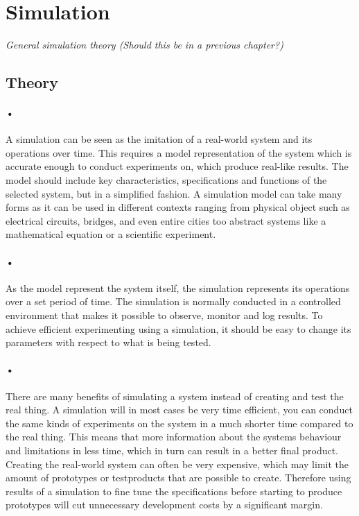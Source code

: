 \documentclass[a4paper]{report}
\begin{document}
\section{Simulation}
\textit{General simulation theory (Should this be in a previous chapter?)}

\subsection{Theory}
\paragraph{•}
A simulation can be seen as the imitation of a real-world system and its operations over time.
This requires a model representation of the system which is accurate enough to conduct experiments on, which produce real-like results.
The model should include key characteristics, specifications and functions of the selected system, but in a simplified fashion.
A simulation model can take many forms as it can be used in different contexts ranging from physical object such as electrical circuits, bridges, and even entire cities too abstract systems like a mathematical equation or a scientific experiment. %

\paragraph{•} 
As the model represent the system itself, the simulation represents its operations over a set period of time.
The simulation is normally conducted in a controlled environment that makes it possible to observe, monitor and log results.
To achieve efficient experimenting using a simulation, it should be easy to change its parameters with respect to what is being tested.

\paragraph{•}
There are many benefits of simulating a system instead of creating and test the real thing.
A simulation will in most cases be very time efficient, you can conduct the same kinds of experiments on the system in a much shorter time compared to the real thing.
This means that more information about the systems behaviour and limitations in less time, which in turn can result in a better final product.
Creating the real-world system can often be very expensive, which may limit the amount of prototypes or testproducts that are possible to create.
Therefore using results of a simulation to fine tune the specifications before starting to produce prototypes will cut unnecessary development costs by a significant margin.
\end{document}
